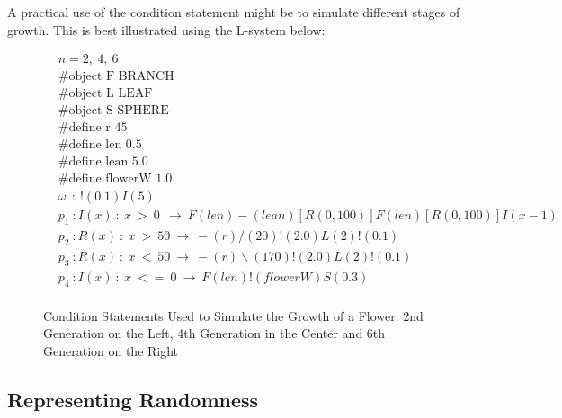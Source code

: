 \begin{flushleft}
\vspace{5mm}

A practical use of the condition statement might be to simulate different stages of growth. This is best illustrated using the L-system below: \\

\vspace{5mm}

\begin{figure}[htbp]

\begin{equation} \label{conditional l-system example}
\begin{aligned}
	&n=2,~4,~6 \\
	&\#\text{object F BRANCH} \\
 	&\#\text{object L LEAF} \\
	&\#\text{object S SPHERE} \\
	&\#\text{define r 45} \\
	&\#\text{define len 0.5} \\
	&\#\text{define lean 5.0} \\
	&\#\text{define flowerW 1.0} \\
	&\omega~~ :~ !(0.1)I(5)\\
	&p_1~ :  I(x)~ :~ x~ >~ 0~~ \rightarrow~ F(len)-(lean)[R({0, 100})]F(len)[R({0, 100})]I(x-1)\\
	&p_2~ :  R(x)~ :~ x~ >~ 50~ \rightarrow~ -(r)/(20)!(2.0)L(2)!(0.1)\\
	&p_3~ :  R(x)~ :~ x~ <~ 50~ \rightarrow~ -(r)\backslash(170)!(2.0)L(2)!(0.1)\\
	&p_4~ :  I(x)~ :~ x~ <=~ 0~ \rightarrow~ F(len)!(flowerW)S(0.3)\\
\end{aligned}
\end{equation}

	{\centering
		\vspace{7px}
		\setlength{\fboxrule}{1pt}
		\caption{Condition Statements Used to Simulate the Growth of a Flower. 2nd Generation on the Left, 4th Generation in the Center and 6th Generation on the Right}
	}
\end{figure}

\FloatBarrier

\end{flushleft}


\subsection{Representing Randomness} \label{Randomness L-system Subsection}

